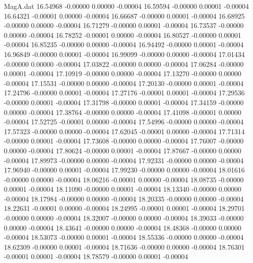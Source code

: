 \begin{filecontents}{MagA.dat}
  16.54968   -0.00000    0.00000   -0.00004
  16.59594   -0.00000    0.00001   -0.00004
  16.64321   -0.00001    0.00000   -0.00004
  16.66687   -0.00000    0.00001   -0.00004
  16.68925   -0.00000    0.00000   -0.00004
  16.71279   -0.00000    0.00001   -0.00004
  16.73537   -0.00000    0.00000   -0.00004
  16.78252   -0.00001    0.00000   -0.00004
  16.80527   -0.00000    0.00001   -0.00004
  16.85235   -0.00000    0.00000   -0.00004
  16.94492   -0.00000    0.00001   -0.00004
  16.96849   -0.00000    0.00001   -0.00004
  16.99099   -0.00000    0.00000   -0.00004
  17.01434   -0.00000    0.00000   -0.00004
  17.03822   -0.00000    0.00000   -0.00004
  17.06284   -0.00000    0.00001   -0.00004
  17.10919   -0.00000    0.00000   -0.00004
  17.13270   -0.00000    0.00000   -0.00004
  17.15531   -0.00000    0.00000   -0.00004
  17.20130   -0.00000    0.00001   -0.00004
  17.24796   -0.00000    0.00001   -0.00004
  17.27176   -0.00001    0.00001   -0.00004
  17.29536   -0.00000    0.00001   -0.00004
  17.31798   -0.00000    0.00001   -0.00004
  17.34159   -0.00000    0.00000   -0.00004
  17.38764   -0.00000    0.00000   -0.00004
  17.41098   -0.00001    0.00000   -0.00004
  17.52725   -0.00001    0.00000   -0.00004
  17.54996   -0.00000    0.00000   -0.00004
  17.57323   -0.00000    0.00000   -0.00004
  17.62045   -0.00001    0.00000   -0.00004
  17.71314   -0.00000    0.00001   -0.00004
  17.73608   -0.00000    0.00000   -0.00004
  17.76007   -0.00000    0.00000   -0.00004
  17.80624   -0.00000    0.00001   -0.00004
  17.87667   -0.00000    0.00000   -0.00004
  17.89973   -0.00000    0.00000   -0.00004
  17.92331   -0.00000    0.00000   -0.00004
  17.96940   -0.00000    0.00001   -0.00004
  17.99230   -0.00000    0.00000   -0.00004
  18.01616   -0.00000    0.00000   -0.00004
  18.06216   -0.00001    0.00000   -0.00004
  18.08735   -0.00000    0.00001   -0.00004
  18.11090   -0.00000    0.00001   -0.00004
  18.13340   -0.00000    0.00000   -0.00004
  18.17984   -0.00000    0.00000   -0.00004
  18.20335   -0.00000    0.00000   -0.00004
  18.22631   -0.00001    0.00000   -0.00004
  18.24995   -0.00001    0.00001   -0.00004
  18.29701   -0.00000    0.00000   -0.00004
  18.32007   -0.00000    0.00000   -0.00004
  18.39033   -0.00000    0.00000   -0.00004
  18.43641   -0.00000    0.00000   -0.00004
  18.48368   -0.00000    0.00000   -0.00004
  18.53073   -0.00000    0.00001   -0.00004
  18.55336   -0.00000    0.00000   -0.00004
  18.62309   -0.00000    0.00001   -0.00004
  18.71636   -0.00000    0.00000   -0.00004
  18.76301   -0.00001    0.00001   -0.00004
  18.78579   -0.00000    0.00001   -0.00004

\end{filecontents}
